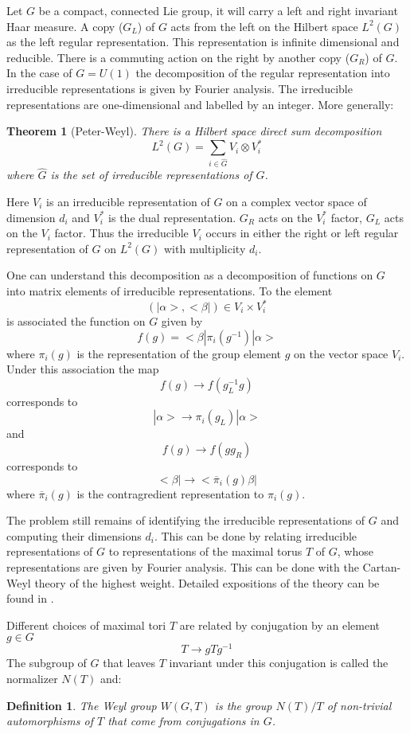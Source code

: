 \documentclass[a4paper,a4paper]{article}
\newtheorem{define}{Definition}
\newtheorem{theorem}{Theorem}
\theoremstyle{conjecture}
\begin{document}
Let $G$ be a compact, connected Lie group, it will carry a left and right invariant Haar measure.  A
copy ($G_L$) of $G$ acts from the left on the Hilbert space $L^2(G)$ as the left regular representation.
This representation is infinite dimensional and reducible. There is a commuting action on the right by
another copy ($G_R$) of $G$. In the case of $G=U(1)$ the decomposition of the regular representation
into irreducible representations is given by Fourier analysis. The irreducible representations are
one-dimensional and labelled by an integer. More generally:

\begin{theorem}[Peter-Weyl]
There is a
Hilbert space direct sum decomposition
$$L^2(G)=\sum_{i\in \hat G}V_i\otimes V_i^*$$
where $\hat G$ is the set of irreducible representations
of $G$.
\end{theorem}

Here $V_i$ is an irreducible representation of $G$ on a complex
vector space of dimension $d_i$ and $V_i^*$ is the dual
representation. $G_R$ acts on the $V_i^*$ factor, $G_L$ acts on
the $V_i$ factor.  Thus the irreducible $V_i$ occurs in either the
right or left regular representation of $G$ on $L^2(G)$ with
multiplicity $d_i$.

One can understand this decomposition as a decomposition of functions on $G$ into matrix
elements of irreducible representations. To the element $$(|\alpha>,<\beta|)\in V_i\times
V_i^*$$
 is associated the function on $G$
given by $$f(g)=<\beta |\pi_i(g^{-1}) |\alpha>$$ where $\pi_i(g)$
is the representation of the group element $g$ on the vector space
$V_i$.  Under this association the map
$$f(g)\rightarrow f(g_L^{-1}g)$$ corresponds to
$$|\alpha>\rightarrow \pi_i(g_L)|\alpha>$$
and
$$f(g)\rightarrow f(gg_R)$$ corresponds to
$$<\beta|\rightarrow <{\overline \pi}_i(g)\beta|$$
where ${\overline \pi}_i(g)$ is the contragredient representation
to $\pi_i(g)$.

The problem still remains of identifying the irreducible
representations of $G$ and computing their dimensions $d_i$. This
can be done by relating irreducible representations of $G$ to
representations of the maximal torus $T$ of $G$, whose
representations are given by Fourier analysis.  This can be done
with the Cartan-Weyl theory of the highest weight. Detailed
expositions of the theory can be found in \cite{Adams,Br-tD}.

Different choices of maximal tori $T$ are related by conjugation by an element $g\in G$
$$T\rightarrow gTg^{-1}$$
The subgroup of $G$ that leaves $T$ invariant under this conjugation is called the
normalizer $N(T)$ and:
\begin{define}
The Weyl group $W(G,T)$ is the group $N(T)/T$ of non-trivial automorphisms of $T$ that
come from conjugations in $G$.
\end{define}
\end{document}

